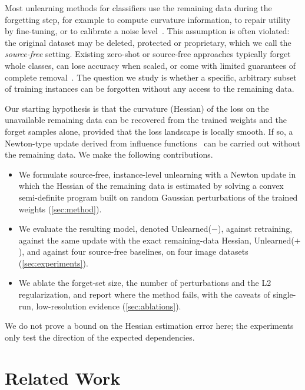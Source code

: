 \documentclass[10pt,twocolumn,letterpaper]{article}
\begin{document}
Most unlearning methods for classifiers use the remaining data during the forgetting step, for example to compute curvature information, to repair utility by fine-tuning, or to calibrate a noise level~\cite{golatkar2020eternal,guo2020certified,kurmanji2023towards}.
This assumption is often violated: the original dataset may be deleted, protected or proprietary, which we call the \emph{source-free} setting.
Existing zero-shot or source-free approaches typically forget whole classes, can lose accuracy when scaled, or come with limited guarantees of complete removal~\cite{chundawat2023zero,foster2024zero}.
The question we study is whether a specific, arbitrary subset of training instances can be forgotten without any access to the remaining data.

Our starting hypothesis is that the curvature (Hessian) of the loss on the unavailable remaining data can be recovered from the trained weights and the forget samples alone, provided that the loss landscape is locally smooth.
If so, a Newton-type update derived from influence functions~\cite{koh2017understanding,guo2020certified} can be carried out without the remaining data.
We make the following contributions.
\begin{itemize}
  \item We formulate source-free, instance-level unlearning with a Newton update in which the Hessian of the remaining data is estimated by solving a convex semi-definite program built on random Gaussian perturbations of the trained weights (\cref{sec:method}).
  \item We evaluate the resulting model, denoted Unlearned($-$), against retraining, against the same update with the exact remaining-data Hessian, Unlearned($+$), and against four source-free baselines, on four image datasets (\cref{sec:experiments}).
  \item We ablate the forget-set size, the number of perturbations and the L2 regularization, and report where the method fails, with the caveats of single-run, low-resolution evidence (\cref{sec:ablations}).
\end{itemize}
We do not prove a bound on the Hessian estimation error here; the experiments only test the direction of the expected dependencies.

\section{Related Work}
\label{sec:related_work}
\end{document}
